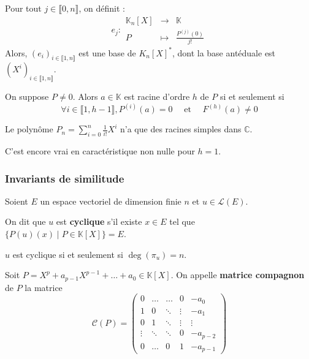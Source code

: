   \begin{application}
    Pour tout $j \in \llbracket 0, n \rrbracket$, on définit :
    \[
    e_j : \begin{array}{ccc}
      \mathbb{K}_n[X] &\rightarrow& \mathbb{K} \\
      P &\mapsto& \frac{P^{(j)}(0)}{j!}
    \end{array}
    \]
    Alors, $(e_i)_{i \in \llbracket 1, n \rrbracket}$ est une base de $K_n[X]^*$, dont la base antéduale est $(X^i)_{i \in \llbracket 1, n \rrbracket}$.
  \end{application}
  
  
  \begin{corollary}
    On suppose $P \neq 0$. Alors $a \in \mathbb{K}$ est racine d'ordre $h$ de $P$ si et seulement si
    \[ \forall i \in \llbracket 1, h-1 \rrbracket, P^{(i)}(a) = 0 \quad \text{ et } \quad F^{(h)}(a) \neq 0 \]
  \end{corollary}
  
  \begin{example}
    Le polynôme $P_n = \sum_{i=0}^{n} \frac{1}{i!} X^{i}$ n'a que des racines simples dans $\mathbb{C}$.
  \end{example}
  
  \begin{remark}
    C'est encore vrai en caractéristique non nulle pour $h = 1$.
  \end{remark}
  
  \subsubsection{Invariants de similitude}
  
  
  Soient $E$ un espace vectoriel de dimension finie $n$ et $u \in \mathcal{L}(E)$.
  
  \begin{definition}
    On dit que $u$ est \textbf{cyclique} s'il existe $x \in E$ tel que $\{ P(u)(x) \mid P \in \mathbb{K}[X] \} = E$.
  \end{definition}
  
  \begin{proposition}
    $u$ est cyclique si et seulement si $\deg(\pi_u) = n$.
  \end{proposition}
  
  \begin{definition}
    Soit $P = X^p + a_{p-1} X^{p-1} + \dots + a_0 \in \mathbb{K}[X]$. On appelle \textbf{matrice compagnon} de $P$ la matrice
    \[ \mathcal{C}(P) = \begin{pmatrix} 0 & \dots & \dots & 0 & -a_0 \\ 1 & 0 & \ddots & \vdots & -a_1 \\ 0 & 1 & \ddots & \vdots & \vdots \\ \vdots & \ddots & \ddots & 0 & -a_{p-2} \\ 0 & \dots & 0 & 1 & -a_{p-1} \end{pmatrix} \]
  \end{definition}
  
